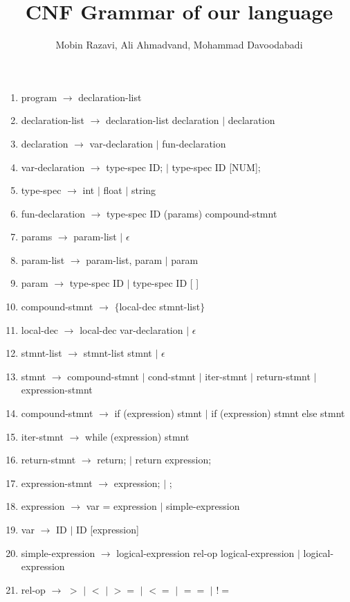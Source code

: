 \documentclass{article}
\begin{document}
\title{CNF Grammar of our language}
\author{Mobin Razavi, Ali Ahmadvand, Mohammad Davoodabadi}
\date{}
\maketitle
\begin{enumerate}
    \item program $\rightarrow$ declaration-list
    \item declaration-list $\rightarrow$ declaration-list   declaration $|$ declaration
    \item declaration $\rightarrow$ var-declaration $|$ fun-declaration
    \item var-declaration $\rightarrow$ type-spec ID; $|$ type-spec ID [NUM];
    \item type-spec $\rightarrow$ int $|$ float $|$ string
    \item fun-declaration $\rightarrow$ type-spec ID (params) compound-stmnt
    \item params $\rightarrow$ param-list $|$ $\epsilon$ 
    \item param-list $\rightarrow$ param-list, param $|$ param
    \item param $\rightarrow$ type-spec ID $|$ type-spec ID [ ]
    \item compound-stmnt $\rightarrow$ $\{$local-dec stmnt-list$\}$
    \item local-dec $\rightarrow$ local-dec var-declaration $|$ $\epsilon$
    \item stmnt-list $\rightarrow$ stmnt-list stmnt $|$ $\epsilon$
    \item stmnt $\rightarrow$ compound-stmnt $|$ cond-stmnt $|$ iter-stmnt $|$ return-stmnt $|$ expression-stmnt
    \item compound-stmnt $\rightarrow$ if (expression) stmnt  $|$ if (expression) stmnt else stmnt
    \item iter-stmnt $\rightarrow$ while (expression) stmnt
    \item return-stmnt $\rightarrow$ return; $|$ return expression;
    \item expression-stmnt $\rightarrow$ expression; $|$ ;
    \item expression $\rightarrow$ var = expression $|$ simple-expression
    \item var $\rightarrow$ ID $|$ ID [expression]
    \item simple-expression $\rightarrow$ logical-expression rel-op logical-expression $|$ logical-expression
    \item rel-op $\rightarrow$ $>$ $|$ $<$ $|$ $>=$ $|$ $<=$ $|$ $==$ $|$ $!=$

\end{enumerate}
\end{document}
